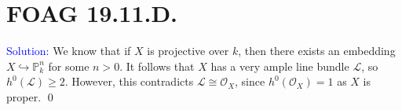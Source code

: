 \documentclass[11pt]{article}
\newcommand{\PP}{\mathbb{P}}
\newcommand{\cL}{\mathcal{L}}
\newcommand{\cO}{\mathcal{O}}
\newenvironment{solution}{\begin{trivlist}\item[]{\textcolor{blue}{Solution:}}}{\qed \end{trivlist}}
\begin{document}
\newpage

\section*{FOAG 19.11.D.}

\begin{solution}
	We know that if $X$ is projective over $k$, then there exists an embedding $X \hookrightarrow \PP_k^n$ for some $n > 0$. It follows that $X$ has a very ample line bundle $\cL$, so $h^0(\cL) \geq 2$. However, this contradicts $\cL \cong \cO_X$, since $h^0(\cO_X) = 1$ as $X$ is proper. 
\end{solution}
\end{document}
